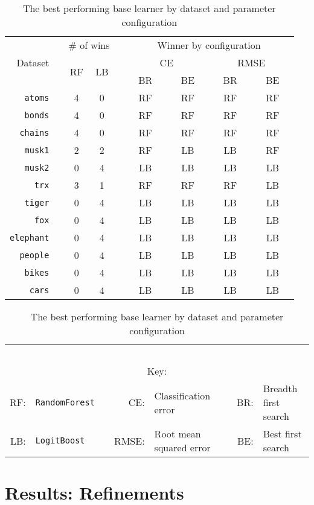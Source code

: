 \documentclass[a4paper,12pt]{report} %
\newcommand{\blRF}{\texttt{RandomForest}\xspace}
\newcommand{\blLB}{\texttt{LogitBoost}\xspace}
\newcommand{\blRFs}{~~RF~~}
\newcommand{\blLBs}{~~LB~~}
\newcommand{\tdsMA}{\texttt{atoms}\xspace}
\newcommand{\tdsMB}{\texttt{bonds}\xspace}
\newcommand{\tdsMC}{\texttt{chains}\xspace}
\newcommand{\tdsMU}{\texttt{musk1}\xspace}
\newcommand{\tdsMK}{\texttt{musk2}\xspace}
\newcommand{\tdsTX}{\texttt{trx}\xspace}
\newcommand{\tdsTG}{\texttt{tiger}\xspace}
\newcommand{\tdsFX}{\texttt{fox}\xspace}
\newcommand{\tdsEL}{\texttt{elephant}\xspace}
\newcommand{\tdsPP}{\texttt{people}\xspace}
\newcommand{\tdsBK}{\texttt{bikes}\xspace}
\newcommand{\tdsCA}{\texttt{cars}\xspace}
\begin{document}
\begin{table}
\centering
\caption{The best performing base learner by dataset and parameter configuration}
\label{tab:bl:winloss}
\begin{tabular}{r l c c l c c c c}
	\toprule
	& \quad & \multicolumn{2}{c}{\# of wins} & \quad & \multicolumn{4}{c}{Winner by configuration}\\
	\cmidrule(r){3-4} \cmidrule(r){6-9}
 	Dataset && \multirow{2}{*}{RF} & \multirow{2}{*}{LB} && \multicolumn{2}{c}{CE} & \multicolumn{2}{c}{RMSE}\\
	&& & && BR & BE & BR & BE \\
	\midrule
	\tdsMA && 4 & 0 && \blRFs & \blRFs & \blRFs & \blRFs\\
	\tdsMB && 4 & 0 && \blRFs & \blRFs & \blRFs & \blRFs\\
	\tdsMC && 4 & 0 && \blRFs & \blRFs & \blRFs & \blRFs\\
	\tdsMU && 2 & 2 && \blRFs & \blLBs & \blLBs & \blRFs\\
	\tdsMK && 0 & 4 && \blLBs & \blLBs & \blLBs & \blLBs\\ 
	\tdsTX && 3 & 1 && \blRFs & \blRFs & \blRFs & \blLBs\\
	\tdsTG && 0 & 4 && \blLBs & \blLBs & \blLBs & \blLBs\\ 
	\tdsFX && 0 & 4 && \blLBs & \blLBs & \blLBs & \blLBs\\ 
	\tdsEL && 0 & 4 && \blLBs & \blLBs & \blLBs & \blLBs\\ 
	\tdsPP && 0 & 4 && \blLBs & \blLBs & \blLBs & \blLBs\\ 
	\tdsBK && 0 & 4 && \blLBs & \blLBs & \blLBs & \blLBs\\
	\tdsCA && 0 & 4 && \blLBs & \blLBs & \blLBs & \blLBs\\
	\midrule
\end{tabular}
\begin{tabular}{r l c r l c r l}
	~\\
	\multicolumn{8}{c}{Key:}\\
	\midrule
	RF: & \blRF && CE: & Classification error && BR: & Breadth first search\\
	LB: & \blLB && RMSE: & Root mean squared error && BE: & Best first search\\
	\bottomrule	
\end{tabular}
\end{table}


\chapter{Results: Refinements}
\label{chap:res:refinements}
\end{document}
